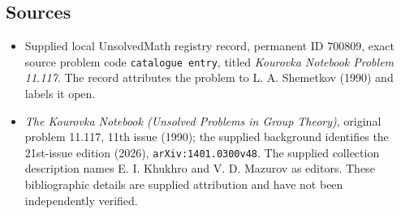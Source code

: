 \documentclass[11pt]{article}
\begin{document}
\subsection{Sources}
\begin{itemize}
\item Supplied local UnsolvedMath registry record, permanent ID \(700809\), exact source problem code \texttt{catalogue entry}, titled \emph{Kourovka Notebook Problem 11.117}. The record attributes the problem to L. A. Shemetkov (1990) and labels it open.
\item \emph{The Kourovka Notebook (Unsolved Problems in Group Theory)}, original problem 11.117, 11th issue (1990); the supplied background identifies the 21st-issue edition (2026), \texttt{arXiv:1401.0300v48}. The supplied collection description names E. I. Khukhro and V. D. Mazurov as editors. These bibliographic details are supplied attribution and have not been independently verified.
\end{itemize}
\end{document}
